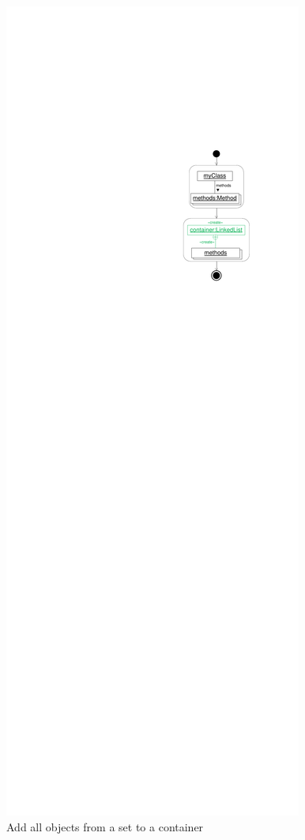 {\begin{figure}[p]
\begin{minipage}{.45\textwidth}
  	\label{fig:reuseObjSet2}
	\end{minipage}
  \hfill
  \begin{minipage}{.45\textwidth}
  	\centering
		\includegraphics[scale=.8]{figures/ReuseObjectSet3}
  	\caption{Add all objects from a set to a container}
  	\label{fig:reuseObjSet3}
	\end{minipage}
\end{figure}

}
